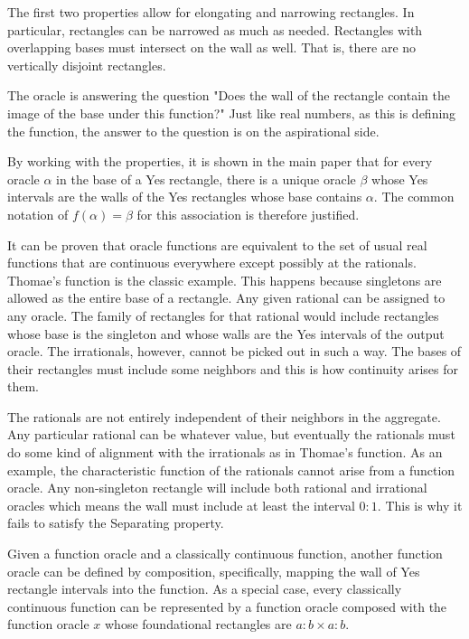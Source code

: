 \documentclass[12pt]{article}
\theoremstyle{remark}
\begin{document}
The first two properties allow for elongating and narrowing rectangles. In particular, rectangles can be narrowed as much as needed. Rectangles with overlapping bases must intersect on the wall as well. That is, there are no vertically disjoint rectangles. 

The oracle is answering the question "Does the wall of the rectangle contain the image of the base under this function?" Just like real numbers, as this is defining the function, the answer to the question is on the aspirational side. 

By working with the properties, it is shown in the  main paper that for every oracle $\alpha$ in the base of a Yes rectangle, there is a unique oracle $\beta$ whose Yes intervals are the walls of the Yes rectangles whose base contains $\alpha$. The common notation of $f(\alpha) = \beta$ for this association is therefore justified. 

It can be proven that oracle functions are equivalent to the set of usual real functions that are continuous everywhere except possibly at the rationals. Thomae's function is the classic example. This happens because singletons are allowed as the entire base of a rectangle. Any given rational can be assigned to any oracle. The family of rectangles for that rational would include rectangles whose base is the singleton and whose walls are the Yes intervals of the output oracle. The irrationals, however, cannot be picked out in such a way. The bases of their rectangles must include some neighbors and this is how continuity arises for them.

The rationals are not entirely independent of their neighbors in the aggregate. Any particular rational can be whatever value, but eventually the rationals must do some kind of alignment with the irrationals as in Thomae's function. As an example, the characteristic function of the rationals cannot arise from a function oracle. Any non-singleton rectangle will include both rational and irrational oracles which means the wall must include at least the interval $0:1$. This is why it fails to satisfy the Separating property. 

Given a function oracle and a classically continuous function, another function oracle can be defined by composition, specifically, mapping the wall of Yes rectangle intervals into the function. As a special case, every classically continuous function can be represented by a function oracle composed with the function oracle $x$ whose foundational rectangles are $a:b \times a:b$.
\end{document}
